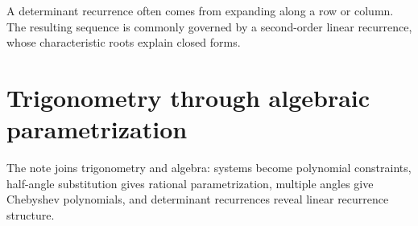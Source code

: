 A determinant recurrence often comes from expanding along a row or column.  The resulting sequence is commonly governed by a second-order linear recurrence, whose characteristic roots explain closed forms.

\section{Trigonometry through algebraic parametrization}

The note joins trigonometry and algebra: systems become polynomial constraints, half-angle substitution gives rational parametrization, multiple angles give Chebyshev polynomials, and determinant recurrences reveal linear recurrence structure.
